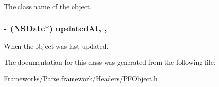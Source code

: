  





The class name of the object. \hypertarget{interface_p_f_object_aa0bd6d2f6c6489b6cc06ef043c4b179a}{}
\subsubsection[{updated\+At}]{\setlength{\rightskip}{0pt plus 5cm}-\/ (N\+S\+Date$\ast$) updated\+At\hspace{0.3cm}{\ttfamily [read]}, {\ttfamily [nonatomic]}, {\ttfamily [strong]}}\label{interface_p_f_object_aa0bd6d2f6c6489b6cc06ef043c4b179a}
When the object was last updated. 

The documentation for this class was generated from the following file\+:\begin{DoxyCompactItemize}
\item 
Frameworks/\+Parse.\+framework/\+Headers/P\+F\+Object.\+h\end{DoxyCompactItemize}
